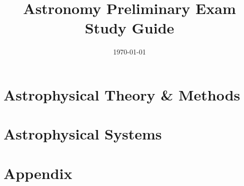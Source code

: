 \documentclass[twoside]{report}
\title{Astronomy Preliminary Exam \\ Study Guide}
\author{\authorlist}
\affil{University of Wisconsin--Madison}
\date{\today}
\numberwithin{equation}{chapter}
\begin{document}
\maketitle



\tableofcontents



\part{Astrophysical Theory \& Methods}







\part{Astrophysical Systems}









\part*{Appendix}


\end{document}
